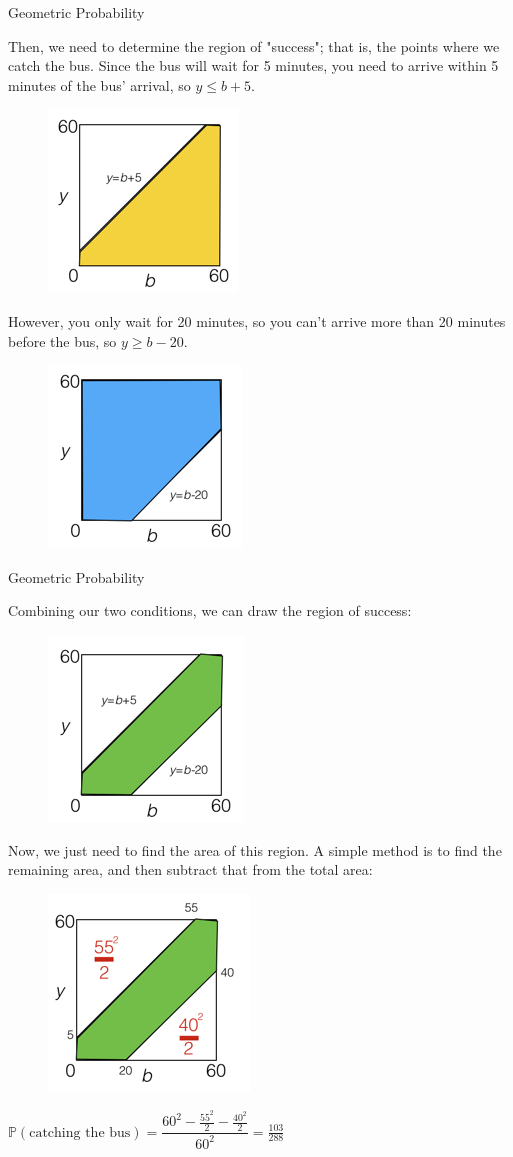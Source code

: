 \documentclass{beamer}
\newcommand{\PP}{\mathbb{P}}
\begin{document}
\begin{frame}{Geometric Probability}

Then, we need to determine the region of "success"; that is, the points where we catch the bus. Since the bus will wait for 5 minutes, you need to arrive within 5 minutes of the bus' arrival, so $y \le b+5$.
\begin{figure}
    \centering
    \includegraphics[width=0.2\linewidth]{geom2.png}
\end{figure}
    \pause
    However, you only wait for 20 minutes, so you can't arrive more than 20 minutes before the bus, so $y \ge b-20$.
\begin{figure}
    \centering
    \includegraphics[width=0.2\linewidth]{geom3.png}
\end{figure}
    
\end{frame}


\begin{frame}{Geometric Probability}

Combining our two conditions, we can draw the region of success:
\begin{figure}
    \centering
    \includegraphics[width=0.2\linewidth]{geom4.png}
\end{figure}
    \pause
    Now, we just need to find the area of this region. A simple method is to find the remaining area, and then subtract that from the total area:
\begin{figure}
    \centering
    \includegraphics[width=0.2\linewidth]{geom5.png}
\end{figure}
\pause
\begin{center}
    $\displaystyle\PP(\text{catching the bus})=\dfrac{60^2-\frac{55^2}{2}-\frac{40^2}{2}}{60^2}=\frac{103}{288}$
\end{center}
\end{frame}
\end{document}
